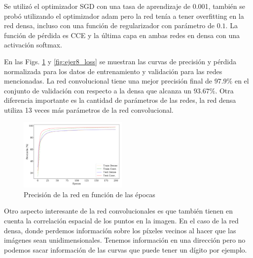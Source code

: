     Se utilizó el optimizador SGD con una tasa de aprendizaje de 0.001, también se probó utilizando el optimizador  adam pero la red tenía a tener overfitting en la red densa, incluso con una función de regularizador con parámetro de $0.1$. La función de pérdida es CCE y la última capa en ambas redes en densa con una activación softmax.

    En las Figs. \ref{fig:ejer8_acc} y \ref{fig:ejer8_loss} se muestran las curvas de precisión y pérdida normalizada para los datos de entrenamiento y validación para las redes mencionadas. La red convolucional tiene una mejor precisión final de $97.9\%$ en el conjunto de validación con respecto a la densa que alcanza un $93.67\%$. Otra diferencia importante es la cantidad de parámetros de las redes, la red densa utiliza  13 veces más parámetros de la red convolucional.
    \begin{figure}[H]
        \begin{small}
            \begin{center}
                \includegraphics[width=0.47\textwidth]{Graphs/ejer8_acc.pdf}
            \end{center}
            \caption{Precisión de la red en función de las épocas}
            \label{fig:ejer8_acc}
        \end{small}
    \end{figure}

    Otro aspecto interesante de la red convolucionales es que también tienen en cuenta  la correlación espacial de los puntos en la imagen. En el caso de la red densa, donde perdemos información sobre los píxeles vecinos al hacer que las imágenes sean unidimensionales. Tenemos información en una dirección pero no podemos sacar información de las curvas que puede tener un dígito por ejemplo.



